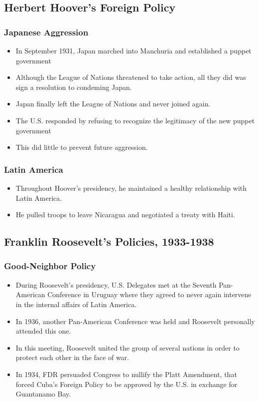 \documentclass[12pt]{article} %
\begin{document}
	\subsection{Herbert Hoover's Foreign Policy}

	\subsubsection{Japanese Aggression}
	\begin{itemize}
		\item In September 1931, Japan marched into Manchuria and established a puppet government
		\item Although the League of Nations threatened to take action, all they did was sign a
			resolution to condeming Japan. 
		\item Japan finally left the League of Nations and never joined again.
		\item The U.S. responded by refusing to recognize the legitimacy of the new puppet government
		\item This did little to prevent future aggression.
	\end{itemize}

	\subsubsection{Latin America}
	\begin{itemize}
		\item Throughout Hoover's presidency, he maintained a healthy relationship with Latin America.
		\item He pulled troops to leave Nicaragua and negotiated a treaty with Haiti.
	\end{itemize}

	\subsection{Franklin Roosevelt's Policies, 1933-1938}
	\subsubsection{Good-Neighbor Policy}
	\begin{itemize}
		\item During Roosevelt's presidency, U.S. Delegates met at the Seventh Pan-American Conference
			in Uruguay where they agreed to never again intervene in the internal affairs of Latin 
			America.
		\item In 1936, another Pan-American Conference was held and Roosevelt personally attended this one.
		\item In this meeting, Roosevelt united the group of several nations in order to protect each other
			in the face of war.
		\item In 1934, FDR persuaded Congress to nullify the Platt Amendment, that forced Cuba's Foreign Policy
			to be approved by the U.S. in exchange for Guantanamo Bay.
	\end{itemize}
\end{document}
